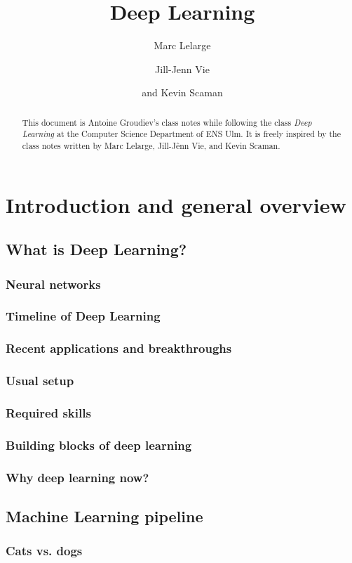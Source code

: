 \documentclass[toc, titlepaged]{../cs-classes/cs-classes}
\title{Deep Learning}
\author{Marc Lelarge\and Jill-Jenn Vie\and and Kevin Scaman}
\begin{document}
\begin{abstract}
    This document is Antoine Groudiev's class notes while following the class \emph{Deep Learning} at the Computer Science Department of ENS Ulm. It is freely inspired by the class notes written by Marc Lelarge, Jill-Jênn Vie, and Kevin Scaman. 
\end{abstract}

\section{Introduction and general overview}
\subsection{What is Deep Learning?}
\subsubsection{Neural networks}
\subsubsection{Timeline of Deep Learning}
\subsubsection{Recent applications and breakthroughs}
\subsubsection{Usual setup}
\subsubsection{Required skills}
\subsubsection{Building blocks of deep learning}
\subsubsection{Why deep learning now?}

\subsection{Machine Learning pipeline}
\subsubsection{Cats vs. dogs}
\end{document}

